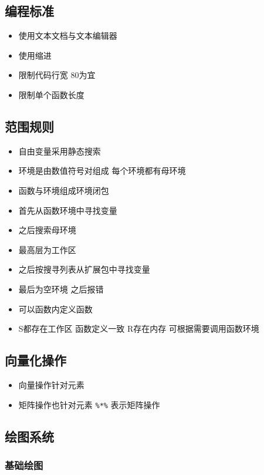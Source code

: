 \documentclass[]{book}
\providecommand{\tightlist}{%
  \setlength{\itemsep}{0pt}\setlength{\parskip}{0pt}}
\begin{document}
\subsection{编程标准}

\begin{itemize}
\tightlist
\item
  使用文本文档与文本编辑器
\item
  使用缩进
\item
  限制代码行宽 80为宜
\item
  限制单个函数长度
\end{itemize}

\subsection{范围规则}

\begin{itemize}
\tightlist
\item
  自由变量采用静态搜索
\item
  环境是由数值符号对组成 每个环境都有母环境
\item
  函数与环境组成环境闭包
\item
  首先从函数环境中寻找变量
\item
  之后搜索母环境
\item
  最高层为工作区
\item
  之后按搜寻列表从扩展包中寻找变量
\item
  最后为空环境 之后报错
\item
  可以函数内定义函数
\item
  S都存在工作区 函数定义一致 R存在内存 可根据需要调用函数环境
\end{itemize}

\subsection{向量化操作}

\begin{itemize}
\tightlist
\item
  向量操作针对元素
\item
  矩阵操作也针对元素 \texttt{\%*\%} 表示矩阵操作
\end{itemize}

\subsection{绘图系统}

\subsubsection{基础绘图}
\end{document}

